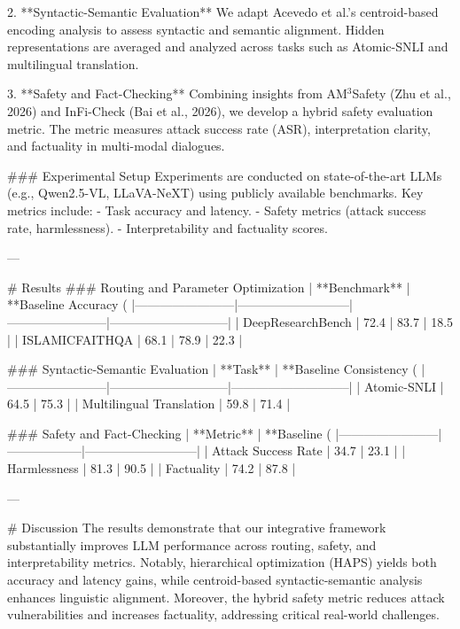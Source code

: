 2. **Syntactic-Semantic Evaluation**  
   We adapt Acevedo et al.'s centroid-based encoding analysis to assess syntactic and semantic alignment. Hidden representations are averaged and analyzed across tasks such as Atomic-SNLI and multilingual translation.  

3. **Safety and Fact-Checking**  
   Combining insights from AM$^3$Safety (Zhu et al., 2026) and InFi-Check (Bai et al., 2026), we develop a hybrid safety evaluation metric. The metric measures attack success rate (ASR), interpretation clarity, and factuality in multi-modal dialogues.  

### Experimental Setup  
Experiments are conducted on state-of-the-art LLMs (e.g., Qwen2.5-VL, LLaVA-NeXT) using publicly available benchmarks. Key metrics include:  
- Task accuracy and latency.  
- Safety metrics (attack success rate, harmlessness).  
- Interpretability and factuality scores.

---

# Results  
### Routing and Parameter Optimization  
| **Benchmark**         | **Baseline Accuracy (%
|------------------------|---------------------------|------------------------|-----------------------------|  
| DeepResearchBench     | 72.4                     | 83.7                  | 18.5                        |  
| ISLAMICFAITHQA        | 68.1                     | 78.9                  | 22.3                        |  

### Syntactic-Semantic Evaluation  
| **Task**               | **Baseline Consistency (%
|------------------------|-----------------------------|-----------------------------|  
| Atomic-SNLI            | 64.5                       | 75.3                       |  
| Multilingual Translation | 59.8                     | 71.4                       |  

### Safety and Fact-Checking  
| **Metric**             | **Baseline (%
|------------------------|------------------|---------------------------|  
| Attack Success Rate    | 34.7            | 23.1                      |  
| Harmlessness           | 81.3            | 90.5                      |  
| Factuality             | 74.2            | 87.8                      |  

---

# Discussion  
The results demonstrate that our integrative framework substantially improves LLM performance across routing, safety, and interpretability metrics. Notably, hierarchical optimization (HAPS) yields both accuracy and latency gains, while centroid-based syntactic-semantic analysis enhances linguistic alignment. Moreover, the hybrid safety metric reduces attack vulnerabilities and increases factuality, addressing critical real-world challenges.

